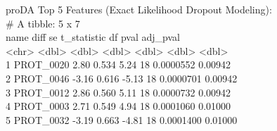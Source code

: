 \documentclass[11pt,oneside]{book}
\begin{document}
\begin{routput}
proDA Top 5 Features (Exact Likelihood Dropout Modeling):\\
\# A tibble: 5 x 7\\
\hspace*{1em}name \hspace*{2em}diff \hspace*{1.8em}se t\_statistic \hspace*{1.5em}df \hspace*{2em}pval \hspace*{1.5em}adj\_pval\\
\hspace*{1em}\textless{}chr\textgreater{} \hspace*{1.5em}\textless{}dbl\textgreater{} \hspace*{1em}\textless{}dbl\textgreater{} \hspace*{2em}\textless{}dbl\textgreater{} \hspace*{1.5em}\textless{}dbl\textgreater{} \hspace*{1.8em}\textless{}dbl\textgreater{} \hspace*{1.8em}\textless{}dbl\textgreater{}\\
1 PROT\_0020 \hspace*{1.2em}2.80 0.534 \hspace*{2.2em}5.24 \hspace*{2em}18 0.0000552 0.00942\\
2 PROT\_0046 -3.16 0.616 \hspace*{1.6em}-5.13 \hspace*{2em}18 0.0000701 0.00942\\
3 PROT\_0012 \hspace*{1.2em}2.86 0.560 \hspace*{2.2em}5.11 \hspace*{2em}18 0.0000732 0.00942\\
4 PROT\_0003 \hspace*{1.2em}2.71 0.549 \hspace*{2.2em}4.94 \hspace*{2em}18 0.0001060 0.01000\\
5 PROT\_0032 -3.19 0.663 \hspace*{1.6em}-4.81 \hspace*{2em}18 0.0001400 0.01000
\end{routput}
\end{document}

